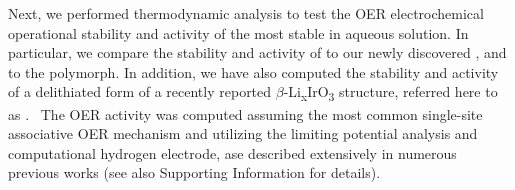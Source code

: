%



%
%
Next, we performed  thermodynamic analysis to test the OER electrochemical operational stability and activity of the most stable \IrOx in aqueous solution.  
In particular, we compare the stability and activity of \rIrOtwo to our newly discovered \aIrOthree, and to the \rIrOthree polymorph.
In addition, we have also computed the stability and activity of a delithiated form of a recently reported $\beta$-Li\textsubscript{x}IrO\textsubscript{3} structure, referred here to as \bIrOthree.~\cite{Pearce2017,Pearce2019}
The OER activity was computed assuming the most common single-site associative OER mechanism and utilizing the limiting potential analysis and computational hydrogen electrode, ase described extensively in numerous previous works\cite{Man2011,Rossmeisl2007,Kitchin2004, Bajdich2013} (see also Supporting Information for details).



